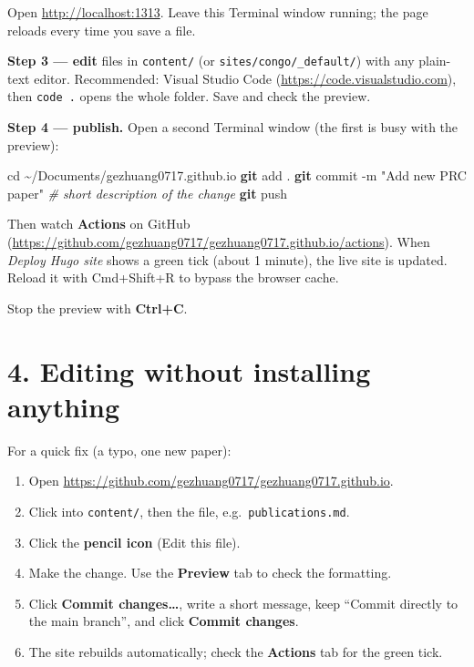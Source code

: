 \documentclass[
  10pt,
]{article}
\newenvironment{Shaded}{\begin{snugshade}}{\end{snugshade}}
\newcommand{\AttributeTok}[1]{\textcolor[rgb]{0.13,0.29,0.53}{#1}}
\newcommand{\BuiltInTok}[1]{#1}
\newcommand{\CommentTok}[1]{\textcolor[rgb]{0.56,0.35,0.01}{\textit{#1}}}
\newcommand{\FunctionTok}[1]{\textcolor[rgb]{0.13,0.29,0.53}{\textbf{#1}}}
\newcommand{\NormalTok}[1]{#1}
\newcommand{\StringTok}[1]{\textcolor[rgb]{0.31,0.60,0.02}{#1}}
\providecommand{\tightlist}{%
  \setlength{\itemsep}{0pt}\setlength{\parskip}{0pt}}
\begin{document}
Open \url{http://localhost:1313}. Leave this Terminal window running;
the page reloads every time you save a file.

\textbf{Step 3 --- edit} files in \texttt{content/} (or
\texttt{sites/congo/\_default/}) with any plain-text editor.
Recommended: Visual Studio Code (\url{https://code.visualstudio.com}),
then \texttt{code\ .} opens the whole folder. Save and check the
preview.

\textbf{Step 4 --- publish.} Open a second Terminal window (the first is
busy with the preview):

\begin{Shaded}
\begin{Highlighting}[]
\BuiltInTok{cd}\NormalTok{ \textasciitilde{}/Documents/gezhuang0717.github.io}
\FunctionTok{git}\NormalTok{ add .}
\FunctionTok{git}\NormalTok{ commit }\AttributeTok{{-}m} \StringTok{"Add new PRC paper"}      \CommentTok{\# short description of the change}
\FunctionTok{git}\NormalTok{ push}
\end{Highlighting}
\end{Shaded}

Then watch \textbf{Actions} on GitHub
(\url{https://github.com/gezhuang0717/gezhuang0717.github.io/actions}).
When \emph{Deploy Hugo site} shows a green tick (about 1 minute), the
live site is updated. Reload it with Cmd+Shift+R to bypass the browser
cache.

Stop the preview with \textbf{Ctrl+C}.

\hypertarget{editing-without-installing-anything}{%
\section{4. Editing without installing
anything}\label{editing-without-installing-anything}}

For a quick fix (a typo, one new paper):

\begin{enumerate}
\def\labelenumi{\arabic{enumi}.}
\tightlist
\item
  Open \url{https://github.com/gezhuang0717/gezhuang0717.github.io}.
\item
  Click into \texttt{content/}, then the file,
  e.g.~\texttt{publications.md}.
\item
  Click the \textbf{pencil icon} (Edit this file).
\item
  Make the change. Use the \textbf{Preview} tab to check the formatting.
\item
  Click \textbf{Commit changes\ldots{}}, write a short message, keep
  ``Commit directly to the main branch'', and click \textbf{Commit
  changes}.
\item
  The site rebuilds automatically; check the \textbf{Actions} tab for
  the green tick.
\end{enumerate}
\end{document}
